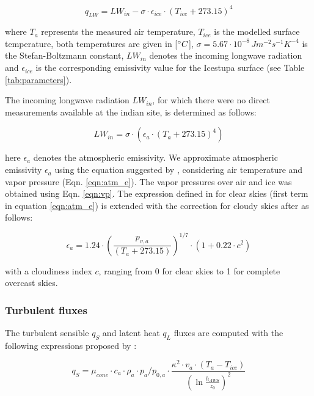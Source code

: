 \documentclass[utf8]{frontiersSCNS} %
\begin{document}
\begin{equation} q_{LW}= LW_{in}-\sigma \cdot \epsilon_{ice} \cdot {(T_{ice}+ 273.15)}^4
\label{eqn:LW} \end{equation}

where $T_a$ represents the measured air temperature, $T_{ice}$ is the modelled surface temperature, both temperatures
are given in [$\degree C$], $\sigma=5.67\cdot 10^{-8}\,Jm^{-2}s^{-1}K^{-4}$ is the Stefan-Boltzmann constant, $LW_{in}$
denotes the incoming longwave radiation and $\epsilon_{ice}$ is the corresponding emissivity value for the Icestupa
surface (see Table \ref{tab:parameters}).

The incoming longwave radiation $LW_{in}$, for which there were no direct measurements available at the indian site, is determined
as follows:

\begin{equation} LW_{in}=\sigma \cdot (\epsilon_a \cdot {(T_a+ 273.15)}^4)
\label{eqn:LWin} \end{equation}

here  $\epsilon_a$ denotes the atmospheric emissivity. We approximate atmospheric emissivity $\epsilon_a$ using the
equation suggested by \cite{Brutsaert_1982}, considering air temperature and vapor pressure (Eqn.  \ref{eqn:atm_e}). The
vapor pressures over air and ice was obtained using Eqn. \ref{eqn:vp}.  The expression defined in \cite{Brutsaert_1975}
for clear skies (first term in equation \ref{eqn:atm_e}) is extended with the correction for cloudy skies after
\cite{Brutsaert_1982} as follows:

\begin{equation} \epsilon_a=1.24 \cdot (\frac{p_{v,a}}{(T_a+273.15)})^{1/7}\cdot(1+0.22\cdot{c}^2) \label{eqn:atm_e}
\end{equation}

with a cloudiness index $c$, ranging from 0 for clear skies to 1 for complete overcast skies.

\subsubsection{Turbulent fluxes }

The turbulent sensible $q_{S}$ and latent heat $q_{L}$ fluxes are computed with the following expressions proposed by
\cite{Garratt_1992}:

\begin{equation} q_{S}=\mu_{cone}\cdot c_{a} \cdot \rho_{a} \cdot p_{a}/p_{0,a} \cdot \frac{\kappa^2 \cdot v_a \cdot
(T_a-T_{ice})}{{(\ln{\frac{h_{AWS}}{z_{0}}})}^2} \label{eqn:qs} \end{equation}
\end{document}
